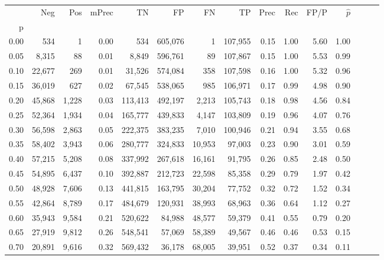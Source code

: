 \begin{tabular}{rrrrrrrrrrrrrrr}
\toprule
{} &     Neg &    Pos & mPrec &       TN &       FP &       FN &       TP &  Prec &   Rec &  FP/P & $\hat{p}$ \\
p    &         &        &       &          &          &          &          &       &       &       &           \\
\midrule
0.00 &     534 &      1 &  0.00 &      534 &  605,076 &        1 &  107,955 &  0.15 &  1.00 &  5.60 &      1.00 \\
0.05 &   8,315 &     88 &  0.01 &    8,849 &  596,761 &       89 &  107,867 &  0.15 &  1.00 &  5.53 &      0.99 \\
0.10 &  22,677 &    269 &  0.01 &   31,526 &  574,084 &      358 &  107,598 &  0.16 &  1.00 &  5.32 &      0.96 \\
0.15 &  36,019 &    627 &  0.02 &   67,545 &  538,065 &      985 &  106,971 &  0.17 &  0.99 &  4.98 &      0.90 \\
0.20 &  45,868 &  1,228 &  0.03 &  113,413 &  492,197 &    2,213 &  105,743 &  0.18 &  0.98 &  4.56 &      0.84 \\
0.25 &  52,364 &  1,934 &  0.04 &  165,777 &  439,833 &    4,147 &  103,809 &  0.19 &  0.96 &  4.07 &      0.76 \\
0.30 &  56,598 &  2,863 &  0.05 &  222,375 &  383,235 &    7,010 &  100,946 &  0.21 &  0.94 &  3.55 &      0.68 \\
0.35 &  58,402 &  3,943 &  0.06 &  280,777 &  324,833 &   10,953 &   97,003 &  0.23 &  0.90 &  3.01 &      0.59 \\
0.40 &  57,215 &  5,208 &  0.08 &  337,992 &  267,618 &   16,161 &   91,795 &  0.26 &  0.85 &  2.48 &      0.50 \\
0.45 &  54,895 &  6,437 &  0.10 &  392,887 &  212,723 &   22,598 &   85,358 &  0.29 &  0.79 &  1.97 &      0.42 \\
0.50 &  48,928 &  7,606 &  0.13 &  441,815 &  163,795 &   30,204 &   77,752 &  0.32 &  0.72 &  1.52 &      0.34 \\
0.55 &  42,864 &  8,789 &  0.17 &  484,679 &  120,931 &   38,993 &   68,963 &  0.36 &  0.64 &  1.12 &      0.27 \\
0.60 &  35,943 &  9,584 &  0.21 &  520,622 &   84,988 &   48,577 &   59,379 &  0.41 &  0.55 &  0.79 &      0.20 \\
0.65 &  27,919 &  9,812 &  0.26 &  548,541 &   57,069 &   58,389 &   49,567 &  0.46 &  0.46 &  0.53 &      0.15 \\
0.70 &  20,891 &  9,616 &  0.32 &  569,432 &   36,178 &   68,005 &   39,951 &  0.52 &  0.37 &  0.34 &      0.11 \\

\end{tabular}
